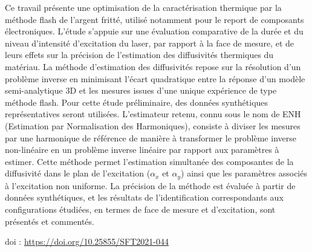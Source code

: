 {\normalsize
Ce travail présente une optimisation de la caractérisation thermique par la méthode flash de l'argent fritté, utilisé notamment pour le report de composants électroniques. L'étude s'appuie sur une évaluation comparative de la durée et du niveau d'intensité d'excitation du laser, par rapport à la face de mesure, et de leurs effets sur la précision de l'estimation des diffusivités thermiques du matériau. La méthode d'estimation des diffusivités repose sur la résolution d'un problème inverse en minimisant l'écart quadratique entre la réponse d'un modèle semi-analytique 3D et les mesures issues d'une unique expérience de type méthode flash. Pour cette étude préliminaire, des données synthétiques représentatives seront utilisées. L'estimateur retenu, connu sous le nom de ENH (Estimation par Normalisation des Harmoniques), consiste à diviser les mesures par une harmonique de référence de manière à transformer le problème inverse non-linéaire en un problème inverse linéaire par rapport aux paramètres à estimer. Cette méthode permet l'estimation simultanée des composantes de la diffusivité dans le plan de l'excitation ($\alpha_x$ et $\alpha_y$) ainsi que les paramètres associés à l'excitation non uniforme. La précision de la méthode est évaluée à partir de données synthétiques, et les résultats de l'identification correspondants aux configurations étudiées, en termes de face de mesure et d'excitation, sont présentés et commentés.



 \vfill doi : \url{https://doi.org/10.25855/SFT2021-044}

}
 
